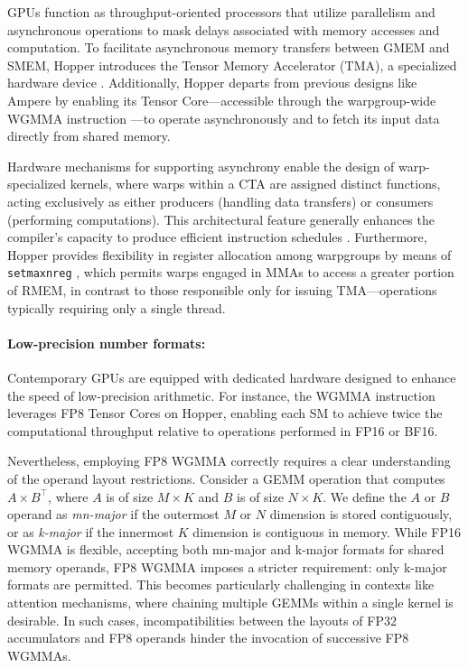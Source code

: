 GPUs function as throughput-oriented processors that utilize parallelism and asynchronous operations to mask delays associated with memory accesses and computation. To facilitate asynchronous memory transfers between GMEM and SMEM, Hopper introduces the Tensor Memory Accelerator (TMA), a specialized hardware device \cite[\S7.29]{cuda}. Additionally, Hopper departs from previous designs like Ampere by enabling its Tensor Core—accessible through the warpgroup-wide WGMMA instruction \cite[\S9.7.14]{ptx}—to operate asynchronously and to fetch its input data directly from shared memory.

Hardware mechanisms for supporting asynchrony enable the design of warp-specialized kernels, where warps within a CTA are assigned distinct functions, acting exclusively as either producers (handling data transfers) or consumers (performing computations). This architectural feature generally enhances the compiler's capacity to produce efficient instruction schedules \citep{warp-specialization-2011}. Furthermore, Hopper provides flexibility in register allocation among warpgroups by means of \verb|setmaxnreg| \cite[\S9.7.17.1]{ptx}, which permits warps engaged in MMAs to access a greater portion of RMEM, in contrast to those responsible only for issuing TMA—operations typically requiring only a single thread.

\paragraph{Low-precision number formats:}
\label{sec:low-precision-gpu}
Contemporary GPUs are equipped with dedicated hardware designed to enhance the speed of low-precision arithmetic. For instance, the WGMMA instruction leverages FP8 Tensor Cores on Hopper, enabling each SM to achieve twice the computational throughput relative to operations performed in FP16 or BF16.

Nevertheless, employing FP8 WGMMA correctly requires a clear understanding of the operand layout restrictions. Consider a GEMM operation that computes $A \times B^{\top}$, where $A$ is of size $M \times K$ and $B$ is of size $N \times K$. We define the $A$ or $B$ operand as \emph{mn-major} if the outermost $M$ or $N$ dimension is stored contiguously, or as \emph{k-major} if the innermost $K$ dimension is contiguous in memory. While FP16 WGMMA is flexible, accepting both mn-major and k-major formats for shared memory operands, FP8 WGMMA imposes a stricter requirement: only k-major formats are permitted. This becomes particularly challenging in contexts like attention mechanisms, where chaining multiple GEMMs within a single kernel is desirable. In such cases, incompatibilities between the layouts of FP32 accumulators and FP8 operands hinder the invocation of successive FP8 WGMMAs.

